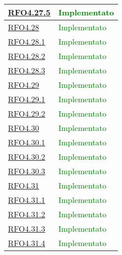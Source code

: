 \begin{longtable}{|>{\centering}m{5cm}|m{5cm}<{\centering}|}
\hyperlink{RFO4.27.5}{RFO4.27.5} & \textcolor{green}{Implementato}\\ \hline

\hyperlink{RFO4.28}{RFO4.28} &  \textcolor{green}{Implementato}\\ \hline

\hyperlink{RFO4.28.1}{RFO4.28.1} &  \textcolor{green}{Implementato}\\ \hline

\hyperlink{RFO4.28.2}{RFO4.28.2} &  \textcolor{green}{Implementato}\\ \hline

\hyperlink{RFO4.28.3}{RFO4.28.3} & \textcolor{green}{Implementato}\\ \hline

\hyperlink{RFO4.29}{RFO4.29} & \textcolor{green}{Implementato}\\ \hline

\hyperlink{RFO4.29.1}{RFO4.29.1} & \textcolor{green}{Implementato}\\ \hline

\hyperlink{RFO4.29.2}{RFO4.29.2} &  \textcolor{green}{Implementato}\\ \hline

\hyperlink{RFO4.30}{RFO4.30} & \textcolor{green}{Implementato}\\ \hline

\hyperlink{RFO4.30.1}{RFO4.30.1} & \textcolor{green}{Implementato}\\ \hline

\hyperlink{RFO4.30.2}{RFO4.30.2} & \textcolor{green}{Implementato}\\ \hline

\hyperlink{RFO4.30.3}{RFO4.30.3} & \textcolor{green}{Implementato}\\ \hline

\hyperlink{RFO4.31}{RFO4.31} & \textcolor{green}{Implementato}\\ \hline

\hyperlink{RFO4.31.1}{RFO4.31.1} &  \textcolor{green}{Implementato}\\ \hline

\hyperlink{RFO4.31.2}{RFO4.31.2} &  \textcolor{green}{Implementato}\\ \hline

\hyperlink{RFO4.31.3}{RFO4.31.3} &  \textcolor{green}{Implementato}\\ \hline

\hyperlink{RFO4.31.4}{RFO4.31.4} & \textcolor{green}{Implementato}\\ \hline


\end{longtable}
